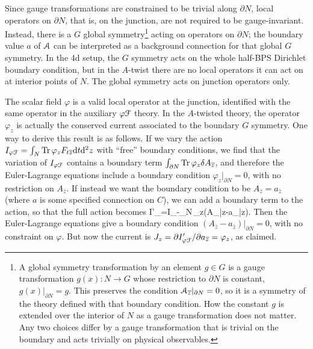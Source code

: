 \documentclass[11pt,a4paper]{article}
\begin{document}
Since gauge transformations are constrained to be trivial along $\partial N$, local operators on $\partial N$, that is, on the junction, 
are not required to be gauge-invariant. Instead, there is a $G$ global symmetry\footnote{\label{defglobal} A global symmetry transformation by an element $g\in G$
is a gauge transformation $g(x):N\to G$ whose restriction to $\partial N$ is constant, $g(x)|_{\partial N}=g$.   This preserves the condition  ${\mathcal A}_{\overline z}|_{\partial N}=0$,
so it is a  symmetry of the theory defined with that boundary condition.  How the constant $g$ is extended over the interior of $N$ as a gauge transformation
does not matter.   Any two choices differ by 
a gauge transformation that is trivial on the boundary and acts trivially  on physical observables.}   
acting on operators on $\partial N$; the boundary value $a$ of ${\mathcal A}$ can be interpreted as a background connection for that global $G$ symmetry. In the 4d setup, the $G$ symmetry acts on the whole half-BPS Dirichlet boundary condition, but in the $A$-twist there are no local operators it can act on at interior points of $N$. The global
symmetry acts on junction operators only. 

The  scalar field $\varphi$ is a valid local operator at the junction, identified with the same operator in the auxiliary $\varphi {\mathcal F}$ theory. 
In the $A$-twisted theory, the operator $\varphi_z$ is actually the conserved current associated to the boundary $G$ symmetry. 
One way to derive this result is as follows.   If we vary the action $I_{\varphi{\mathcal F}}=\int_N {\rm Tr}\,\varphi_z F_{t\overline z}\mathrm d t \mathrm d^2z$ with ``free''
boundary conditions, we find that the variation of $I_{\varphi {\mathcal F}}$ contains a boundary term $\int_{\partial N} {\rm Tr}\,\varphi_z\delta A_{\overline z}$,
and therefore the Euler-Lagrange equations include a boundary condition $\varphi_z|_{\partial N}=0$, with no restriction on $A_{\bar z}$.   If instead
we want the boundary condition to be $A_{\bar z}=a_{\bar z}$ (where $a$ is some specified connection on $C$), we can add a boundary
term to the action, so that the full action becomes
\be\label{fullact} I'_{\varphi\cF}=I_{\varphi\cF}-\int_{\partial N}\Tr\,\varphi_z(A_{\bar z}-a_{\bar z}).\ee
Then the Euler-Lagrange equations give a boundary condition $(A_{\bar z}-a_{\bar z})|_{\partial N}=0$, with no constraint on $\varphi$.
But now the current is $J_z=\partial I'_{\varphi{\mathcal F}}/\partial a_{\overline z}=\varphi_z$, as claimed.
\end{document}
